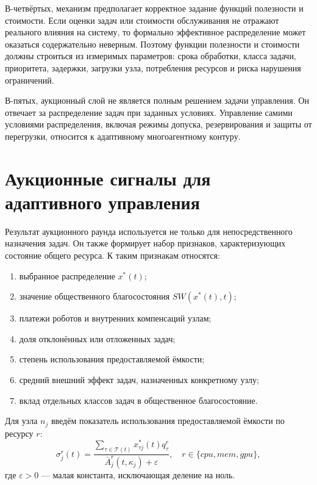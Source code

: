 В-четвёртых, механизм предполагает корректное задание функций полезности и стоимости. Если оценки задач или стоимости обслуживания не отражают реального влияния на систему, то формально эффективное распределение может оказаться содержательно неверным. Поэтому функции полезности и стоимости должны строиться из измеримых параметров: срока обработки, класса задачи, приоритета, задержки, загрузки узла, потребления ресурсов и риска нарушения ограничений.

В-пятых, аукционный слой не является полным решением задачи управления. Он отвечает за распределение задач при заданных условиях. Управление самими условиями распределения, включая режимы допуска, резервирования и защиты от перегрузки, относится к адаптивному многоагентному контуру.

\section{Аукционные сигналы для адаптивного управления}

Результат аукционного раунда используется не только для непосредственного назначения задач. Он также формирует набор признаков, характеризующих состояние общего ресурса. К таким признакам относятся:
\begin{enumerate}
    \item выбранное распределение $x^*(t)$;
    \item значение общественного благосостояния $SW(x^*(t),t)$;
    \item платежи роботов и внутренних компенсаций узлам;
    \item доля отклонённых или отложенных задач;
    \item степень использования предоставляемой ёмкости;
    \item средний внешний эффект задач, назначенных конкретному узлу;
    \item вклад отдельных классов задач в общественное благосостояние.
\end{enumerate}

Для узла $n_j$ введём показатель использования предоставляемой ёмкости по ресурсу $r$:
\begin{equation}
\sigma^r_j(t)=
\frac{\sum_{\tau\in\mathcal{T}(t)}x^*_{\tau j}(t)q^r_{\tau}}
{\bar{A}^{r}_{j}(t,\kappa_j)+\varepsilon},
\quad r\in\{cpu,mem,gpu\},
\label{eq:ch3_exposed_capacity_usage}
\end{equation}
где $\varepsilon>0$ --- малая константа, исключающая деление на ноль.

